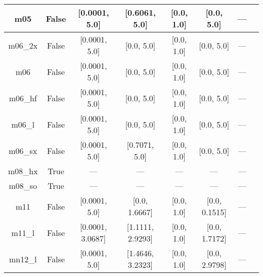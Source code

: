 \begin{tabular}{|c|c|c|c|c|c|c|l|}
          m05 &                 False &    [0.0001, 5.0] &    [0.6061, 5.0] &    [0.0, 1.0] &     [0.0, 5.0] &        --- &                                                             \cite{Zhao2005_161103} \\ \hline
      m06\_2x &                 False &    [0.0001, 5.0] &       [0.0, 5.0] &    [0.0, 1.0] &     [0.0, 5.0] &        --- &                                                                \cite{Zhao2008_215} \\ \hline
          m06 &                 False &    [0.0001, 5.0] &       [0.0, 5.0] &    [0.0, 1.0] &     [0.0, 5.0] &        --- &                                                                \cite{Zhao2008_215} \\ \hline
      m06\_hf &                 False &    [0.0001, 5.0] &       [0.0, 5.0] &    [0.0, 1.0] &     [0.0, 5.0] &        --- &                                                              \cite{Zhao2006_13126} \\ \hline
       m06\_l &                 False &    [0.0001, 5.0] &       [0.0, 5.0] &    [0.0, 1.0] &     [0.0, 5.0] &        --- &                                                \cite{Zhao2006_194101,Zhao2008_215} \\ \hline
      m06\_sx &                 False &    [0.0001, 5.0] &    [0.7071, 5.0] &    [0.0, 1.0] &     [0.0, 5.0] &        --- &                                                               \cite{Wang2020_2294} \\ \hline
      m08\_hx &                  True &              --- &              --- &           --- &            --- &        --- &                                                               \cite{Zhao2008_1849} \\ \hline
      m08\_so &                  True &              --- &              --- &           --- &            --- &        --- &                                                               \cite{Zhao2008_1849} \\ \hline
          m11 &                 False &    [0.0001, 5.0] &    [0.0, 1.6667] &    [0.0, 1.0] &  [0.0, 0.1515] &        --- &                                                           \cite{Peverati2011_2810} \\ \hline
       m11\_l &                 False & [0.0001, 3.0687] & [1.1111, 2.9293] &    [0.0, 1.0] &  [0.0, 1.7172] &        --- &                                                            \cite{Peverati2012_117} \\ \hline
      mn12\_l &                 False &    [0.0001, 5.0] & [1.4646, 3.2323] &    [0.0, 1.0] &  [0.0, 2.9798] &        --- &                                                          \cite{Peverati2012_13171} \\ \hline

\end{tabular}
